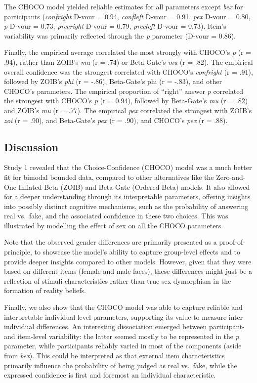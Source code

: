 \documentclass[
  jou,
  floatsintext,
  longtable,
  nolmodern,
  notxfonts,
  notimes,
  colorlinks=true,linkcolor=blue,citecolor=blue,urlcolor=blue]{apa7}
\begin{document}
The CHOCO model yielded reliable estimates for all parameters except
\emph{bex} for participants (\emph{confright} D-vour = 0.94,
\emph{confleft} D-vour = 0.91, \emph{pex} D-vour = 0.80, \emph{p} D-vour
= 0.73, \emph{precright} D-vour = 0.79, \emph{precleft} D-vour = 0.73).
Item's variability was primarily reflected through the \emph{p}
parameter (D-vour = 0.86).

Finally, the empirical average correlated the most strongly with CHOCO's
\emph{p} (r = .94), rather than ZOIB's \emph{mu} (r = .74) or
Beta-Gate's \emph{mu} (r = .82). The empirical overall confidence was
the strongest correlated with CHOCO's \emph{confright} (r = .91),
followed by ZOIB's \emph{phi} (r = -.86), Beta-Gate's phi (r = -.83),
and other CHOCO's parameters. The empirical proportion of ``right''
answer \emph{p} correlated the strongest with CHOCO's \emph{p} (r =
0.94), followed by Beta-Gate's \emph{mu} (r = .82) and ZOIB's \emph{mu}
(r = .77). The empirical \emph{pex} correlated the strongest with ZOIB's
\emph{zoi} (r = .90), and Beta-Gate's \emph{pex} (r = .90), and CHOCO's
\emph{pex} (r = .88).

\subsection{Discussion}\label{discussion}

Study 1 revealed that the Choice-Confidence (CHOCO) model was a much
better fit for bimodal bounded data, compared to other alternatives like
the Zero-and-One Inflated Beta (ZOIB) and Beta-Gate (Ordered Beta)
models. It also allowed for a deeper understanding through its
interpretable parameters, offering insights into possibly distinct
cognitive mechanisms, such as the probability of answering real
vs.~fake, and the associated confidence in these two choices. This was
illustrated by modelling the effect of sex on all the CHOCO parameters.

Note that the observed gender differences are primarily presented as a
proof-of-principle, to showcase the model's ability to capture
group-level effects and to provide deeper insights compared to other
models. However, given that they were based on different items (female
and male faces), these differences might just be a reflection of stimuli
characteristics rather than true sex dymorphism in the formation of
reality beliefs.

Finally, we also show that the CHOCO model was able to capture reliable
and interpretable individual-level parameters, supporting its value to
measure inter-individual differences. An interesting dissociation
emerged between participant- and item-level variability: the latter
seemed mostly to be represented in the \emph{p} parameter, while
participants reliably varied in most of the components (aside from
\emph{bex}). This could be interpreted as that external item
characteristics primarily influence the probability of being judged as
real vs.~fake, while the expressed confidence is first and foremost an
individual characteristic.
\end{document}
